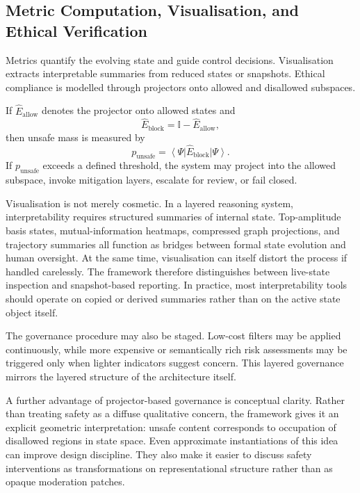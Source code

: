 \documentclass[12pt]{article}
\newcommand{\ket}[1]{\left|#1\right\rangle}
\newcommand{\bra}[1]{\left\langle#1\right|}
\newcommand{\I}{\mathbb{I}}
\begin{document}
\subsection{Metric Computation, Visualisation, and Ethical Verification}
Metrics quantify the evolving state and guide control decisions. Visualisation extracts interpretable summaries from reduced states or snapshots. Ethical compliance is modelled through projectors onto allowed and disallowed subspaces.

If $\hat{E}_{\text{allow}}$ denotes the projector onto allowed states and
\begin{equation}
\hat{E}_{\text{block}} = \I - \hat{E}_{\text{allow}},
\end{equation}
then unsafe mass is measured by
\begin{equation}
 p_{\text{unsafe}} = \bra{\Psi}\hat{E}_{\text{block}}\ket{\Psi}.
\end{equation}
If $p_{\text{unsafe}}$ exceeds a defined threshold, the system may project into the allowed subspace, invoke mitigation layers, escalate for review, or fail closed.

Visualisation is not merely cosmetic. In a layered reasoning system, interpretability requires structured summaries of internal state. Top-amplitude basis states, mutual-information heatmaps, compressed graph projections, and trajectory summaries all function as bridges between formal state evolution and human oversight. At the same time, visualisation can itself distort the process if handled carelessly. The framework therefore distinguishes between live-state inspection and snapshot-based reporting. In practice, most interpretability tools should operate on copied or derived summaries rather than on the active state object itself.

The governance procedure may also be staged. Low-cost filters may be applied continuously, while more expensive or semantically rich risk assessments may be triggered only when lighter indicators suggest concern. This layered governance mirrors the layered structure of the architecture itself.

A further advantage of projector-based governance is conceptual clarity. Rather than treating safety as a diffuse qualitative concern, the framework gives it an explicit geometric interpretation: unsafe content corresponds to occupation of disallowed regions in state space. Even approximate instantiations of this idea can improve design discipline. They also make it easier to discuss safety interventions as transformations on representational structure rather than as opaque moderation patches.
\end{document}
